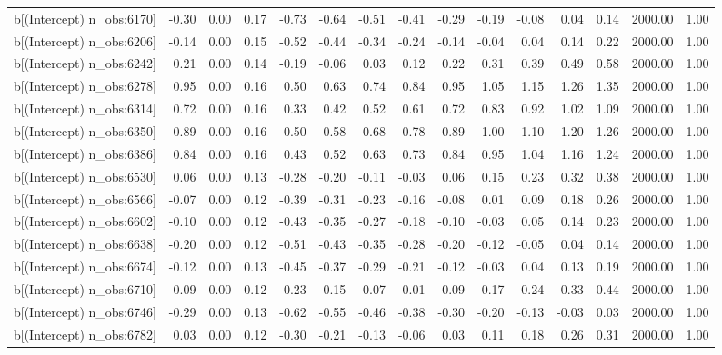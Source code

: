 \begin{table}[ht]
\begin{tabular}{rrrrrrrrrrrrrrr}
  b[(Intercept) n\_obs:6170] & -0.30 & 0.00 & 0.17 & -0.73 & -0.64 & -0.51 & -0.41 & -0.29 & -0.19 & -0.08 & 0.04 & 0.14 & 2000.00 & 1.00 \\ 
  b[(Intercept) n\_obs:6206] & -0.14 & 0.00 & 0.15 & -0.52 & -0.44 & -0.34 & -0.24 & -0.14 & -0.04 & 0.04 & 0.14 & 0.22 & 2000.00 & 1.00 \\ 
  b[(Intercept) n\_obs:6242] & 0.21 & 0.00 & 0.14 & -0.19 & -0.06 & 0.03 & 0.12 & 0.22 & 0.31 & 0.39 & 0.49 & 0.58 & 2000.00 & 1.00 \\ 
  b[(Intercept) n\_obs:6278] & 0.95 & 0.00 & 0.16 & 0.50 & 0.63 & 0.74 & 0.84 & 0.95 & 1.05 & 1.15 & 1.26 & 1.35 & 2000.00 & 1.00 \\ 
  b[(Intercept) n\_obs:6314] & 0.72 & 0.00 & 0.16 & 0.33 & 0.42 & 0.52 & 0.61 & 0.72 & 0.83 & 0.92 & 1.02 & 1.09 & 2000.00 & 1.00 \\ 
  b[(Intercept) n\_obs:6350] & 0.89 & 0.00 & 0.16 & 0.50 & 0.58 & 0.68 & 0.78 & 0.89 & 1.00 & 1.10 & 1.20 & 1.26 & 2000.00 & 1.00 \\ 
  b[(Intercept) n\_obs:6386] & 0.84 & 0.00 & 0.16 & 0.43 & 0.52 & 0.63 & 0.73 & 0.84 & 0.95 & 1.04 & 1.16 & 1.24 & 2000.00 & 1.00 \\ 
  b[(Intercept) n\_obs:6530] & 0.06 & 0.00 & 0.13 & -0.28 & -0.20 & -0.11 & -0.03 & 0.06 & 0.15 & 0.23 & 0.32 & 0.38 & 2000.00 & 1.00 \\ 
  b[(Intercept) n\_obs:6566] & -0.07 & 0.00 & 0.12 & -0.39 & -0.31 & -0.23 & -0.16 & -0.08 & 0.01 & 0.09 & 0.18 & 0.26 & 2000.00 & 1.00 \\ 
  b[(Intercept) n\_obs:6602] & -0.10 & 0.00 & 0.12 & -0.43 & -0.35 & -0.27 & -0.18 & -0.10 & -0.03 & 0.05 & 0.14 & 0.23 & 2000.00 & 1.00 \\ 
  b[(Intercept) n\_obs:6638] & -0.20 & 0.00 & 0.12 & -0.51 & -0.43 & -0.35 & -0.28 & -0.20 & -0.12 & -0.05 & 0.04 & 0.14 & 2000.00 & 1.00 \\ 
  b[(Intercept) n\_obs:6674] & -0.12 & 0.00 & 0.13 & -0.45 & -0.37 & -0.29 & -0.21 & -0.12 & -0.03 & 0.04 & 0.13 & 0.19 & 2000.00 & 1.00 \\ 
  b[(Intercept) n\_obs:6710] & 0.09 & 0.00 & 0.12 & -0.23 & -0.15 & -0.07 & 0.01 & 0.09 & 0.17 & 0.24 & 0.33 & 0.44 & 2000.00 & 1.00 \\ 
  b[(Intercept) n\_obs:6746] & -0.29 & 0.00 & 0.13 & -0.62 & -0.55 & -0.46 & -0.38 & -0.30 & -0.20 & -0.13 & -0.03 & 0.03 & 2000.00 & 1.00 \\ 
  b[(Intercept) n\_obs:6782] & 0.03 & 0.00 & 0.12 & -0.30 & -0.21 & -0.13 & -0.06 & 0.03 & 0.11 & 0.18 & 0.26 & 0.31 & 2000.00 & 1.00 \\ 

\end{tabular}
\end{table}
